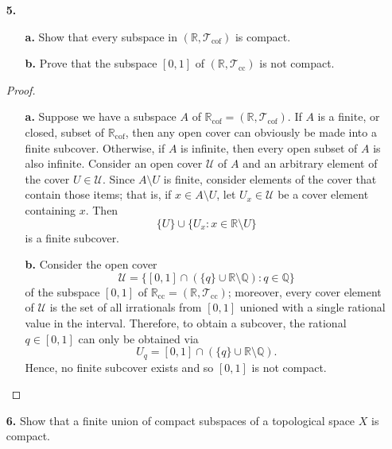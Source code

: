 \documentclass[ 12pt ]{article}
\begin{document}
\begin{enumerate}
	\item[\textbf{5.}] $ $
		\begin{enumerate}
			\item[\textbf{a.}] Show that every subspace in $(\mathbb{R}, \mathcal{T}_\mathrm{cof})$ is compact.
			\item[\textbf{b.}] Prove that the subspace $[0, 1]$ of $(\mathbb{R}, \mathcal{T}_\mathrm{cc})$ is not compact.
		\end{enumerate}

		\begin{proof} $ $
			\begin{enumerate}
				\item[\textbf{a.}] Suppose we have a subspace $A$ of $\mathbb{R}_\mathrm{cof} = (\mathbb{R}, \mathcal{T}_\mathrm{cof})$. If $A$ is a finite, or closed, subset of
					$\mathbb{R}_\mathrm{cof}$, then any open cover can obviously be made into a finite subcover. Otherwise, if $A$ is infinite, then every open subset of $A$ is also
					infinite. Consider an open cover $\mathcal{U}$ of $A$ and an arbitrary element of the cover $U \in \mathcal{U}$. Since $A \setminus U$ is finite, consider elements
					of the cover that contain those items; that is, if $x \in A \setminus U$, let $U_x \in \mathcal{U}$ be a cover element containing $x$. Then $$\{ U \} \cup \{ U_x :
					x \in \mathbb{R} \setminus U \}$$ is a finite subcover.

				\item[\textbf{b.}] Consider the open cover $$\mathcal{U} = \{ [0, 1] \cap \left ( \{ q \} \cup \mathbb{R} \setminus \mathbb{Q} \right ) : q \in \mathbb{Q} \}$$ of the
					subspace $[0, 1]$ of $\mathbb{R}_\mathrm{cc} = (\mathbb{R}, \mathcal{T}_\mathrm{cc})$; moreover, every cover element of $\mathcal{U}$ is the set of all irrationals
					from $[0, 1]$ unioned with a single rational value in the interval. Therefore, to obtain a subcover, the rational $q \in [0, 1]$ can only be obtained via $$U_q =
					[0, 1] \cap \left ( \{ q \} \cup \mathbb{R} \setminus \mathbb{Q} \right ).$$ Hence, no finite subcover exists and so $[0, 1]$ is not compact.
			\end{enumerate}
		\end{proof}


	\item[\textbf{6.}] Show that a finite union of compact subspaces of a topological space $X$ is compact.


\end{enumerate}
\end{document}
